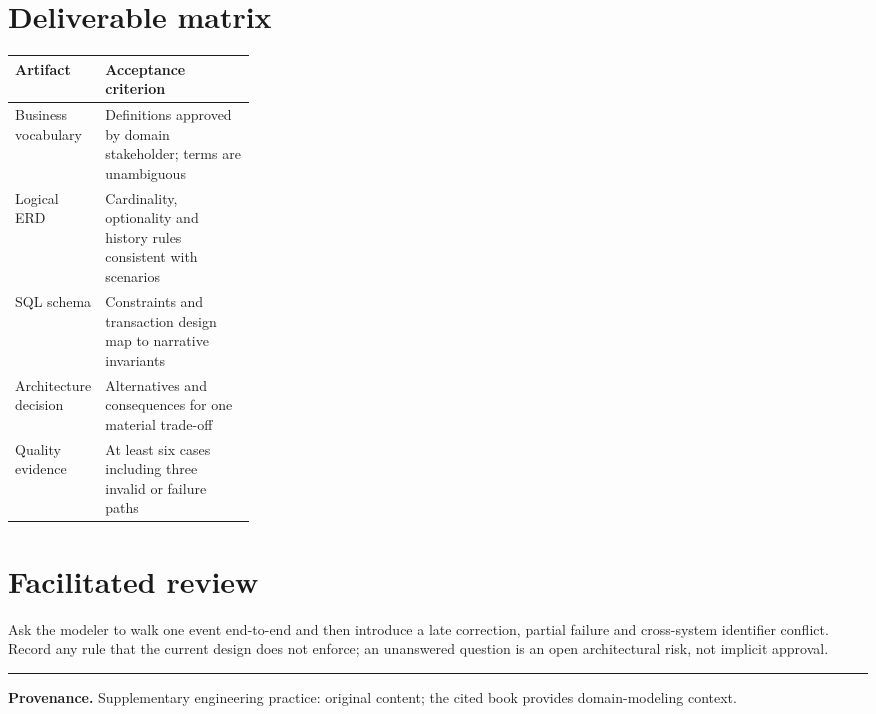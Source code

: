 \documentclass[11pt,letterpaper]{article}
\begin{document}
\section{Deliverable matrix}
\begin{tabularx}{\linewidth}{@{}>{\raggedright\arraybackslash}p{0.28\linewidth}>{\raggedright\arraybackslash}X@{}}
\toprule
\textbf{Artifact} & \textbf{Acceptance criterion} \\ 
\midrule
Business vocabulary & Definitions approved by domain stakeholder; terms are unambiguous \\ 
Logical ERD & Cardinality, optionality and history rules consistent with scenarios \\ 
SQL schema & Constraints and transaction design map to narrative invariants \\ 
Architecture decision & Alternatives and consequences for one material trade-off \\ 
Quality evidence & At least six cases including three invalid or failure paths \\ 
\bottomrule
\end{tabularx}

\section{Facilitated review}
Ask the modeler to walk one event end-to-end and then introduce a late correction, partial failure and cross-system identifier conflict. Record any rule that the current design does not enforce; an unanswered question is an open architectural risk, not implicit approval.


\vfill
\hrule
{\footnotesize\textbf{Provenance.} Supplementary engineering practice: original content; the cited book provides domain-modeling context.}
\end{document}
